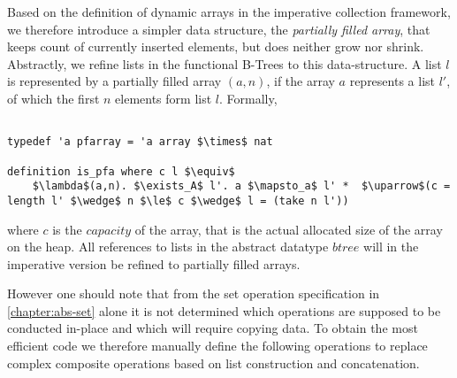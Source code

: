 Based on the definition of dynamic arrays in the 
imperative collection framework,
we therefore introduce a simpler data structure,
the \textit{partially filled array},
that keeps count of currently inserted elements,
but does neither grow nor shrink.
Abstractly, we refine lists in the functional B-Trees to this
data-structure.
A list $l$ is represented by a partially filled array $(a,n)$,
if the array $a$ represents a list $l'$, of which the first $n$
elements form list $l$.
Formally,

\begin{lstlisting}[mathescape=true, language=Isabelle]

typedef 'a pfarray = 'a array $\times$ nat

definition is_pfa where c l $\equiv$
    $\lambda$(a,n). $\exists_A$ l'. a $\mapsto_a$ l' *  $\uparrow$(c = length l' $\wedge$ n $\le$ c $\wedge$ l = (take n l'))
\end{lstlisting}

where $c$ is the $capacity$ of the array, that is the actual allocated size
of the array on the heap.
All references to lists in the abstract datatype $btree$
will in the imperative version be refined to partially filled arrays.

However one should note that
from the set operation specification in \autoref{chapter:abs-set} alone
it is not determined which operations are supposed to be conducted
in-place and which will require copying data.
To obtain the most efficient code we therefore manually
define the following operations to replace complex composite
operations based on list construction and concatenation.

